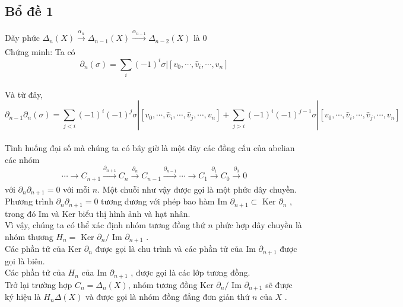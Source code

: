 \subsection[Bổ đề 1]{Bổ đề 1}
\indent Dãy phức  \(\Delta_n(X)\xrightarrow[]{\alpha_n}\Delta_{n-1}(X)\xrightarrow[]{\alpha_{n-1}}\Delta_{n-2}(X)\) là \(0\) \\
\indent Chứng minh: Ta có \[\partial_n(\sigma) = \sum_{i}(-1)^i\sigma|[v_0, \cdots,\hat{v}_i,\cdots,v_n]\] \\
\indent Và từ đây, \[\partial_{n-1}\partial_n(\sigma) = \sum_{j<i}(-1)^i(-1)^j\sigma|[v_0, \cdots,\hat{v}_i,\cdots,\hat{v}_j,\cdots,v_n]  + \sum_{j>i}(-1)^i(-1)^{j-1}\sigma|[v_0, \cdots,\hat{v}_i,\cdots,\hat{v}_j,\cdots,v_n] \] \\
\indent Tình huống đại số mà chúng ta có bây giờ là một dãy các đồng cấu của abelian các nhóm 
\[\cdots\rightarrow C_{n+1} \xrightarrow[]{\partial_{n+1}} C_{n} \xrightarrow[]{\partial_{n}} C_{n-1} \xrightarrow[]{\partial_{n-1}} \cdots \rightarrow C_1 \xrightarrow[]{\partial_{1}} C_0 \xrightarrow[]{\partial_{0}} 0 \]
với \(\partial_n\partial_{n+1} = 0\) với mỗi \(n\). Một chuỗi như vậy được gọi là một phức dây chuyền. \\
\indent Phương trình \(\partial_n\partial_{n+1} = 0\) tương đương với phép bao hàm Im \(\partial_{n+1} \subset\) Ker \(\partial_n\) , trong đó Im và Ker biểu thị hình ảnh và hạt nhân. \\
\indent Vì vậy, chúng ta có thể xác định nhóm tương đồng thứ \(n\) phức hợp dây chuyền là nhóm thương \(H_n =\) Ker \(\partial_n / \) Im \(\partial_{n+1}\) . \\
\indent Các phần tử của Ker \(\partial_n\) được gọi là chu trình và các phần tử của Im \(\partial_{n+1}\) được gọi là biên.  \\
\indent Các phần tử của \(H_n\) của Im \(\partial_{n+1}\) , được gọi là các lớp tương đồng. \\
\indent Trở lại trường hợp \(C_n = \Delta_n(X)\), nhóm tương đồng Ker \(\partial_n/\) Im \(\partial_{n+1}\) sẽ được ký hiệu là \(H_n\Delta(X)\) và được gọi là nhóm đồng đẳng đơn giản thứ \(n\) của \(X\) . 
\newpage

